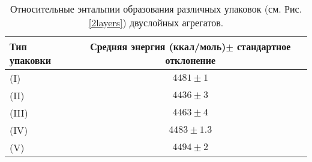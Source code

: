 
\begin{table}
\caption{\label{tab:enthalp} Относительные энтальпии образования различных упаковок (см. Рис. \ref{2layers}) двуслойных агрегатов. }

	\begin{tabular}{l|c}
          Тип упаковки        &  Средняя энергия (ккал/моль)$\pm$ стандартное отклонение \\
	\hline
(I)	&   $4481\pm1$ \\
(II)	&   $4436\pm3$\\
(III)	&   $4463\pm4$\\
(IV)	&   $4483\pm1.3$\\
(V)	&   $4494\pm2$\\

\end{tabular}

	
\end{table}

	 